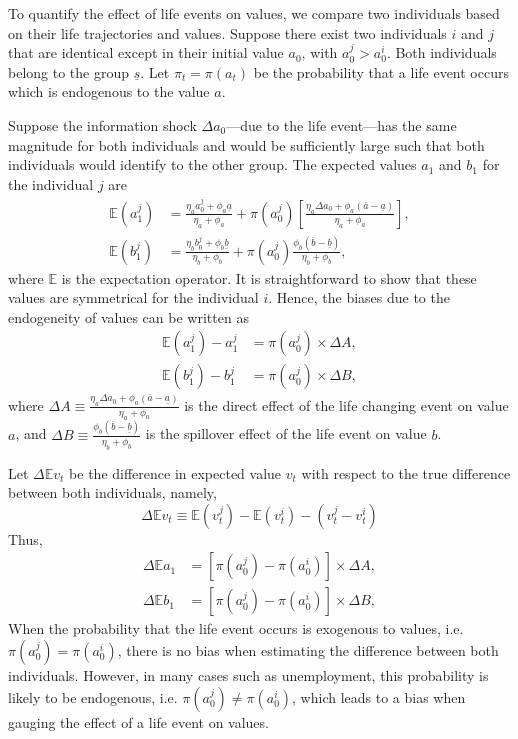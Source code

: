 To quantify the effect of life events on values, we compare two individuals based on their life trajectories and values. Suppose there exist two individuals $i$ and $j$ that are identical except in their initial value $a_0$, with $a_0^j > a_0^i$. Both individuals belong to the group $\underline{s}$.
Let $\pi_t = \pi(a_t)$ be the probability that a life event occurs which is endogenous to the value $a$.

Suppose the information shock $\Delta a_0$---due to the life event---has the same magnitude for both individuals and would be sufficiently large such that both individuals would identify to the other group. The expected values $a_1$ and $b_1$ for the individual $j$ are
\begin{align}
    \mathbb{E}(a_1^j) &= \frac{\eta_a a^j_0 + \phi_a \underline{a}}{\eta_a+\phi_a} + \pi(a_0^j)\left[ \frac{\eta_a\Delta a_0 + \phi_a(\overline{a}-\underline{a})}{\eta_a+\phi_a} \right],\\
    \mathbb{E}(b_1^j) &= \frac{\eta_b b^j_0 + \phi_b \underline{b}}{\eta_b+\phi_b} + \pi(a_0^j)\frac{\phi_b(\overline{b}-\underline{b})}{\eta_b+\phi_b},
\end{align}
where $\mathbb{E}$ is the expectation operator. It is straightforward to show that these values are symmetrical for the individual $i$. Hence, the biases due to the endogeneity of values can be written as 
\begin{align}
    \mathbb{E}(a_1^j) - a_1^j &= \pi(a_0^j)\times\Delta A,\\
    \mathbb{E}(b_1^j) - b_1^j&= \pi(a_0^j)\times\Delta B,
\end{align}
where $\Delta A \equiv \frac{\eta_a\Delta a_0 + \phi_a(\overline{a}-\underline{a})}{\eta_a+\phi_a}$ is the direct effect of the life changing event on value $a$, and $\Delta B \equiv  \frac{\phi_b(\overline{b}-\underline{b})}{\eta_b+\phi_b}$ is the spillover effect of the life event on value $b$.


Let $\Delta\mathbb{E}v_t$ be the difference in expected value $v_t$ with respect to the true difference between both individuals, namely,
\begin{equation}
    \Delta\mathbb{E}v_t \equiv \mathbb{E}(v_t^j) - \mathbb{E}(v_t^i) - (v_t^j - v_t^i)
\end{equation}
Thus,
\begin{align}
    \Delta\mathbb{E}a_1 &= \left[\pi(a_0^j) - \pi(a_0^i)\right]\times\Delta A,\label{chap3-eq:DeltaA}\\
    \Delta\mathbb{E}b_1 &= \left[\pi(a_0^j) - \pi(a_0^i)\right]\times\Delta B,\label{chap3-eq:DeltaB}
\end{align}
When the probability that the life event occurs is exogenous to values, i.e. $\pi(a_0^j) = \pi(a_0^i)$, there is no bias when estimating the difference between both individuals. 
However, in many cases such as unemployment, this probability is likely to be endogenous, i.e. $\pi(a_0^j) \neq \pi(a_0^i)$, which leads to a bias when gauging the effect of a life event on values.

